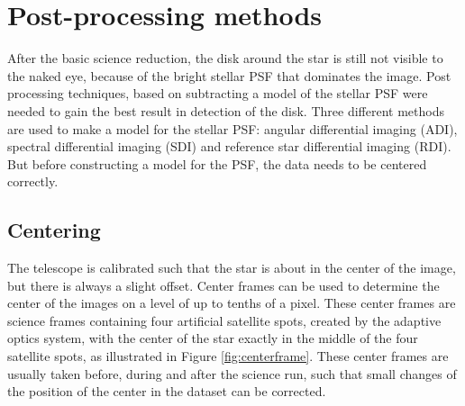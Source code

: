 \documentclass[twoside,single]{lion-msc}
\begin{document}
\section{Post-processing methods}
After the basic science reduction, the disk around the star is still not visible to the naked eye, because of the bright stellar PSF that dominates the image. Post processing techniques, based on subtracting a model of the stellar PSF were needed to gain the best result in detection of the disk. Three different methods are used to make a model for the stellar PSF: angular differential imaging (ADI), spectral differential imaging (SDI) and reference star differential imaging (RDI). But before constructing a model for the PSF, the data needs to be centered correctly.

\subsection{Centering}
The telescope is calibrated such that the star is about in the center of the image, but there is always a slight offset. Center frames can be used to determine the center of the images on a level of up to tenths of a pixel. These center frames are science frames containing four artificial satellite spots, created by the adaptive optics system, with the center of the star exactly in the middle of the four satellite spots, as illustrated in Figure \ref{fig:centerframe}. These center frames are usually taken before, during and after the science run, such that small changes of the position of the center in the dataset can be corrected.
\end{document}
